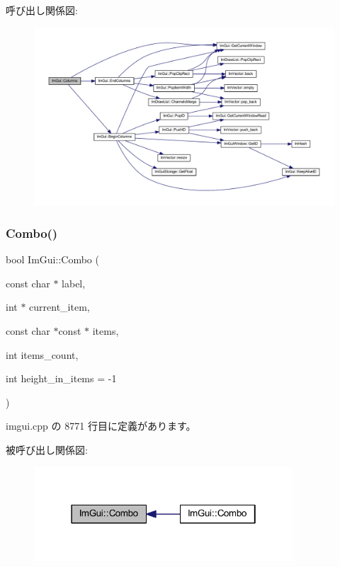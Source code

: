呼び出し関係図\+:\nopagebreak
\begin{figure}[H]
\begin{center}
\leavevmode
\includegraphics[width=350pt]{namespace_im_gui_a0e2889956542527c4039b6b8bf5c2a38_cgraph}
\end{center}
\end{figure}
\mbox{\label{namespace_im_gui_ae801624ec02dac3b2b03321fffd91f1a}} 
\subsubsection{\texorpdfstring{Combo()}{Combo()}\hspace{0.1cm}{\footnotesize\ttfamily [1/3]}}
{\footnotesize\ttfamily bool Im\+Gui\+::\+Combo (\begin{DoxyParamCaption}\item[{const char $\ast$}]{label,  }\item[{int $\ast$}]{current\+\_\+item,  }\item[{const char $\ast$const $\ast$}]{items,  }\item[{int}]{items\+\_\+count,  }\item[{int}]{height\+\_\+in\+\_\+items = {\ttfamily -\/1} }\end{DoxyParamCaption})}



 imgui.\+cpp の 8771 行目に定義があります。

被呼び出し関係図\+:\nopagebreak
\begin{figure}[H]
\begin{center}
\leavevmode
\includegraphics[width=274pt]{namespace_im_gui_ae801624ec02dac3b2b03321fffd91f1a_icgraph}
\end{center}
\end{figure}
\mbox{\label{namespace_im_gui_ae80520312b19a7039b77d2bafcbda8e5}} 
